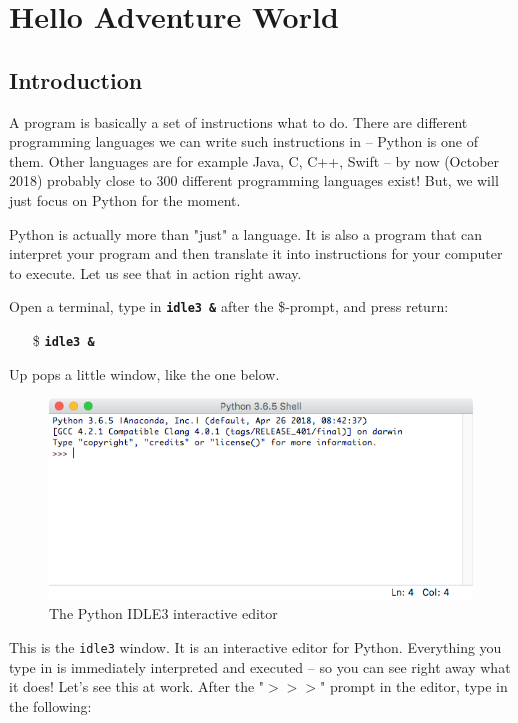 \chapter{Hello Adventure World} 

\section{Introduction}

A program is basically a set of instructions what to do. There are different programming languages we can write such instructions in -- Python is one of them. Other languages are for example Java, C, C++, Swift -- by now (October 2018) probably close to 300 different programming languages exist! But, we will just focus on Python for the moment. 

Python is actually more than "just" a language. It is also a program that can interpret your program and then translate it into instructions for your computer to execute. Let us see that in action right away. 

Open a terminal, type in \textbf{\texttt{idle3 \&}} after the \$-prompt, and press return: 

\begin{itemize}
\item[\$] \textbf{\texttt{idle3 \&}}
\end{itemize}

Up pops a little window, like the one below.  
 
\begin{figure}[h]
\centerline{\includegraphics[scale=.70]{images/p1ch1-idle3.png}}
\caption{The Python IDLE3 interactive editor}
\end{figure}

This is the \texttt{idle3} window. It is an interactive editor for Python. Everything you type in is immediately interpreted and executed -- so you can see right away what it does! 
Let's see this at work. After the "$>>>$" prompt in the editor, type in the following: 

